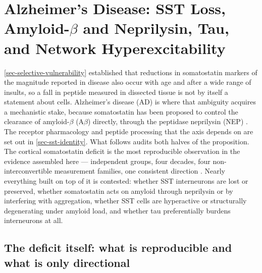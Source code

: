 \documentclass[11pt]{article}
\begin{document}
\section{Alzheimer's Disease: SST Loss, Amyloid-$\beta$ and Neprilysin, Tau, and Network Hyperexcitability}
\label{sec-alzheimers}

\ref{sec-selective-vulnerability} established that reductions in somatostatin markers of the magnitude reported in disease also occur with age and after a wide range of insults, so a fall in peptide measured in dissected tissue is not by itself a statement about cells. Alzheimer's disease (AD) is where that ambiguity acquires a mechanistic stake, because somatostatin has been proposed to control the clearance of amyloid-$\beta$ (A$\beta$) directly, through the peptidase neprilysin (NEP) \citep{Saito2005,Nilsson2020,Watamura2021}. The receptor pharmacology and peptide processing that the axis depends on are set out in \ref{sec-sst-identity}. What follows audits both halves of the proposition. The cortical somatostatin deficit is the most reproducible observation in the evidence assembled here --- independent groups, four decades, four non-interconvertible measurement families, one consistent direction \citep{Davies1981,Rossor1980,Arai1984,Mazurek1991,Consens2022a,Castanho2025b}. Nearly everything built on top of it is contested: whether SST interneurons are lost or preserved, whether somatostatin acts on amyloid through neprilysin or by interfering with aggregation, whether SST cells are hyperactive or structurally degenerating under amyloid load, and whether tau preferentially burdens interneurons at all.

\subsection{The deficit itself: what is reproducible and what is only directional}
\label{sec-04-the-deficit}
\end{document}
